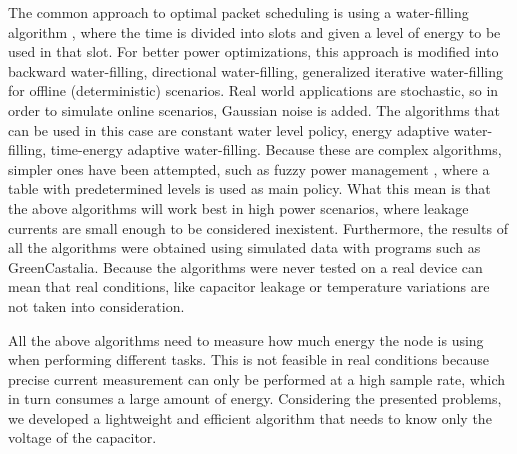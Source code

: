 The common approach to optimal packet scheduling is using a water-filling algorithm
\cite{yang2012optimal} \cite{huan2013utility}, where the time
is divided into slots and given a level of energy to be used in that slot. For better power
optimizations, this approach is modified into backward water-filling, directional water-filling,
generalized iterative water-filling \cite{want2015iterative} for offline (deterministic) scenarios.
Real world applications are stochastic, so in order to simulate online scenarios, Gaussian noise is
added. The algorithms that can be used in this case are constant water level policy, energy
adaptive water-filling\cite{ozel2012optimal}, time-energy adaptive water-filling\cite{ozel2011transimision}.
Because these are complex algorithms, simpler ones have been attempted, such as fuzzy power
management\cite{aoudia2016fuzzy} , where a table with predetermined levels is used as main policy.
What this mean is that the above algorithms will work best in high power scenarios, where leakage
currents are small enough to be considered inexistent. Furthermore, the results of all the
algorithms were obtained using simulated data with programs such as
GreenCastalia\cite{benedetti2013greencastalia}. Because the algorithms were never tested on a
real device can mean that real conditions, like capacitor leakage or temperature variations are not taken into consideration.

All the above algorithms need to measure how much energy the node is using when performing
different tasks. This is not feasible in real conditions because precise current measurement can only be
performed at a high sample rate, which in turn consumes a large amount of energy. Considering the
presented problems, we developed a lightweight and efficient algorithm that needs to know only the
voltage of the capacitor.

